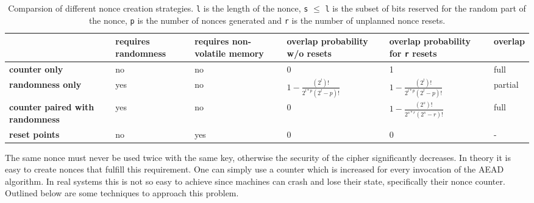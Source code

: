 \begin{table}[htb]
	\footnotesize
	\caption{Comparsion of different nonce creation strategies. \texttt{l} is the length of the
		nonce, \texttt{s} $\leq$ \texttt{l} is the subset of bits reserved for the random part of the nonce,
		\texttt{p} is the number of nonces generated and \texttt{r} is the number of unplanned nonce
		resets.}
	\label{tab:nonce}
	\renewcommand\arraystretch{2}
	\begin{tabularx}{1.1\linewidth}{|X|X|X|X|X|X|}
		\hline
		                                        & \textbf{requires randomness}                       & \textbf{requires non-volatile memory} & \textbf{overlap probability w/o
		resets}                                 & \textbf{overlap probability for \texttt{r} resets} & \textbf{overlap}                                                                                                    \\
		\hline
		\textbf{counter only}                   & no                                                 & no                                    & 0                               & 1                                  & full \\
		\hline
		\textbf{randomness only}                & yes                                                & no                                    &
		$1-\frac{(2^l)!}{2^{l*p}(2^l-p)!}$
		                                        & $1-\frac{(2^l)!}{2^{l*p}(2^l-p)!}$                 & partial                                                                                                             \\
		\hline
		\textbf{counter paired with randomness} & yes                                                & no                                    & 0                               & $1-\frac{(2^s)!}{2^{s*r}(2^s-r)!}$
		                                        & full                                                                                                                                                                     \\
		\hline
		\textbf{reset points}                   & no                                                 & yes                                   & 0                               & 0                                  & -    \\
		\hline
	\end{tabularx}%
\end{table}

The same nonce must never be used twice with the same key, otherwise the security of the
cipher significantly decreases. In theory it is easy to create nonces that fulfill this
requirement. One can simply use a counter which is increased for every invocation of the
AEAD algorithm. In real systems this is not so easy to achieve since machines can crash
and lose their state, specifically their nonce counter. Outlined below are some techniques
to approach this problem.

